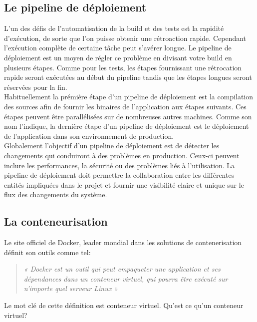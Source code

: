     \subsection{Le pipeline de déploiement}\label{DeployementPipeline}
    L'un des défis de l'automatisation de la build et des tests est la rapidité d'exécution, de sorte que l'on puisse obtenir une rétroaction rapide. Cependant l'exécution complète de certaine tâche peut s'avérer longue. Le pipeline de déploiement \cite{Fow13} est un moyen de régler ce problème en divisant votre build en plusieurs étapes. Comme pour les tests, les étapes fournissant une rétrocation rapide seront exécutées au début du pipeline tandis que les étapes longues seront réservées pour la fin.\\

    Habituellement la prémière étape d'un pipeline de déploiement est la compilation des sources afin de fournir les binaires de l'application aux étapes suivants. Ces étapes peuvent être parallélisées sur de nombreuses autres machines. Comme son nom l'indique, la dernière étape d'un pipeline de déploiement est le déploiement de l'application dans son environnement de production.\\

    Globalement l'objectif d'un pipeline de déploiement est de détecter les changements qui conduiront à des problèmes en production. Ceux-ci peuvent inclure les performances, la sécurité ou des problèmes liés à l'utilisation. La pipeline de déploiement doit permettre la collaboration entre les différentes entités impliquées dans le projet et fournir une visibilité claire et unique sur le flux des changements du système.

    \subsection{La conteneurisation}\label{Containers}
    Le site officiel de Docker, leader mondial dans les solutions de contenerisation définit son outils comme tel:\\

    \begin{quotation}
      \emph{« Docker est un outil qui peut empaqueter une application et ses dépendances dans un conteneur virtuel, qui pourra être exécuté sur n’importe quel serveur Linux »}\\
    \end{quotation}

    Le mot clé de cette définition est conteneur virtuel. Qu’est ce qu’un conteneur virtuel?

